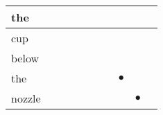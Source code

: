 \documentclass[landscape]{article}
\newcommand{\ssp}{\hspace{2pt}}
\newcommand{\mex}{\cellcolor{g}$\bullet$}
\begin{document}
\begin{tabular}{|l|p{10pt}|p{10pt}|p{10pt}|p{10pt}|p{10pt}|p{10pt}|p{10pt}|p{10pt}|p{10pt}|}
\hline
\ssp the \ssp&\hspace{2pt}&\hspace{2pt}&\hspace{2pt}&\hspace{2pt}&\hspace{2pt}&\hspace{2pt}&\hspace{2pt}&\hspace{2pt}&\hspace{2pt}\\
\hline
\ssp cup \ssp&\hspace{2pt}&\hspace{2pt}&\hspace{2pt}&\hspace{2pt}&\hspace{2pt}&\hspace{2pt}&\hspace{2pt}&\hspace{2pt}&\hspace{2pt}\\
\hline
\ssp below \ssp&\hspace{2pt}&\hspace{2pt}&\hspace{2pt}&\hspace{2pt}&\hspace{2pt}&\hspace{2pt}&\hspace{2pt}&\hspace{2pt}&\hspace{2pt}\\
\hline
\ssp \cellcolor{ref6}the \ssp&\hspace{2pt}&\hspace{2pt}&\hspace{2pt}&\hspace{2pt}&\hspace{2pt}&\hspace{2pt}&\hspace{2pt}\mex&\hspace{2pt}&\hspace{2pt}\\
\hline
\ssp \cellcolor{ref7}nozzle \ssp&\hspace{2pt}&\hspace{2pt}&\hspace{2pt}&\hspace{2pt}&\hspace{2pt}&\hspace{2pt}&\hspace{2pt}&\hspace{2pt}\mex&\hspace{2pt}\\

\end{tabular}
\end{document}
